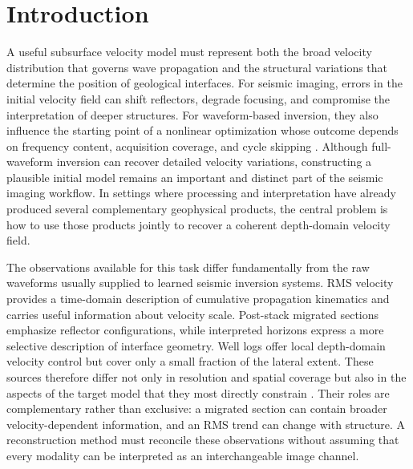 \section{Introduction}

A useful subsurface velocity model must represent both the broad velocity distribution that governs wave propagation and the structural variations that determine the position of geological interfaces. For seismic imaging, errors in the initial velocity field can shift reflectors, degrade focusing, and compromise the interpretation of deeper structures. For waveform-based inversion, they also influence the starting point of a nonlinear optimization whose outcome depends on frequency content, acquisition coverage, and cycle skipping \citep{stolt1978migration,tarantola1984inversion,bunks1995multiscale,virieux2009overview}. Although full-waveform inversion can recover detailed velocity variations, constructing a plausible initial model remains an important and distinct part of the seismic imaging workflow. In settings where processing and interpretation have already produced several complementary geophysical products, the central problem is how to use those products jointly to recover a coherent depth-domain velocity field.

The observations available for this task differ fundamentally from the raw waveforms usually supplied to learned seismic inversion systems. RMS velocity provides a time-domain description of cumulative propagation kinematics and carries useful information about velocity scale. Post-stack migrated sections emphasize reflector configurations, while interpreted horizons express a more selective description of interface geometry. Well logs offer local depth-domain velocity control but cover only a small fraction of the lateral extent. These sources therefore differ not only in resolution and spatial coverage but also in the aspects of the target model that they most directly constrain \citep{dix1955velocities,stolt1978migration,hampson2001multiattribute}. Their roles are complementary rather than exclusive: a migrated section can contain broader velocity-dependent information, and an RMS trend can change with structure. A reconstruction method must reconcile these observations without assuming that every modality can be interpreted as an interchangeable image channel.

